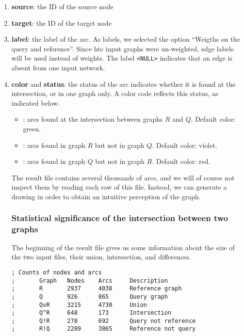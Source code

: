 \begin{enumerate}
\item \textbf{source}: the ID of the source node
  
\item \textbf{target}: the ID of the target node
  
\item \textbf{label}: the label of the arc. As labels, we selected
  the option ``Weigths on the query and reference''. Since hte
  input graphs were un-weighted, edge labels will be used instead
  of weights. The label \texttt{<NULL>} indicates that an edge is
  absent from one input network.
  
\item \textbf{color} and \textbf{status}: the status of the arc
  indicates whether it is found at the intersection, or in one graph
  only.  A color code reflects this status, as indicated below.
  \begin{itemize}
  \item {}: arcs found at the intersection between graphs $R$
    and $Q$. Default color: green.
  \item {}: arcs found in graph $R$ but not in graph
    $Q$. Default color: violet.
  \item {}: arcs found in graph $Q$ but not in graph
    $R$. Default color: red.
  \end{itemize}

  The result file contains several thousands of arcs, and we will of
  course not inspect them by reading each row of this file. Instead,
  we can generate a drawing in order to obtain an intuitive perception
  of the graph.

\subsubsection{Statistical significance of the intersection between two graphs}

The beginning of the result file gives us some information about the
size of the two input files, their union, intersection, and
differences.

\begin{footnotesize}
\begin{verbatim}
; Counts of nodes and arcs
;       Graph   Nodes    Arcs     Description
;       R       2937     4038     Reference graph
;       Q       926      865      Query graph
;       QvR     3215     4730     Union
;       Q^R     648      173      Intersection
;       Q!R     278      692      Query not reference
;       R!Q     2289     3865     Reference not query
\end{verbatim}
\end{footnotesize}


\end{enumerate}
